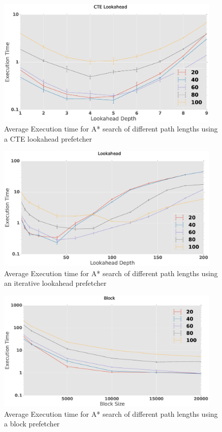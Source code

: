 \begin{figure}[htbp]
	\centering
	\includegraphics[width=0.95\textwidth]{figs/prefetch-CTE.eps}
	\caption{Average Execution time for A* search of different path lengths using a CTE lookahead prefetcher}
	\label{fig:prefetch-CTE}
\end{figure}
\begin{figure}[htbp]
	\centering
	\includegraphics[width=0.95\textwidth]{figs/prefetch-itr.eps}
	\caption{Average Execution time for A* search of different path lengths using an iterative lookahead prefetcher}
	\label{fig:prefetch-lookahead}
\end{figure}
\begin{figure}[htbp]
	\centering
	\includegraphics[width=0.95\textwidth]{figs/prefetch-block.eps}
	\caption{Average Execution time for A* search of different path lengths using a block prefetcher}
	\label{fig:prefetch-block}
\end{figure}
